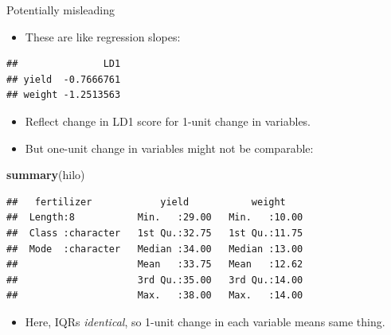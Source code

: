 \documentclass[ignorenonframetext,]{beamer}
\newenvironment{Shaded}{\begin{snugshade}}{\end{snugshade}}
\newcommand{\FloatTok}[1]{\textcolor[rgb]{0.00,0.00,0.81}{#1}}
\newcommand{\KeywordTok}[1]{\textcolor[rgb]{0.13,0.29,0.53}{\textbf{#1}}}
\newcommand{\NormalTok}[1]{#1}
\newcommand{\OperatorTok}[1]{\textcolor[rgb]{0.81,0.36,0.00}{\textbf{#1}}}
\providecommand{\tightlist}{%
  \setlength{\itemsep}{0pt}\setlength{\parskip}{0pt}}
\begin{document}
\begin{frame}[fragile]{Potentially misleading}
\protect\hypertarget{potentially-misleading}{}

\begin{itemize}
\tightlist
\item
  These are like regression slopes:
\end{itemize}

\begin{Shaded}
\end{Shaded}

\begin{verbatim}
##               LD1
## yield  -0.7666761
## weight -1.2513563
\end{verbatim}

\begin{itemize}
\item
  Reflect change in LD1 score for 1-unit change in variables.
\item
  But one-unit change in variables might not be comparable:
\end{itemize}

\begin{Shaded}
\begin{Highlighting}[]
\KeywordTok{summary}\NormalTok{(hilo)}
\end{Highlighting}
\end{Shaded}

\begin{verbatim}
##   fertilizer            yield           weight     
##  Length:8           Min.   :29.00   Min.   :10.00  
##  Class :character   1st Qu.:32.75   1st Qu.:11.75  
##  Mode  :character   Median :34.00   Median :13.00  
##                     Mean   :33.75   Mean   :12.62  
##                     3rd Qu.:35.00   3rd Qu.:14.00  
##                     Max.   :38.00   Max.   :14.00
\end{verbatim}

\begin{itemize}
\tightlist
\item
  Here, IQRs \emph{identical}, so 1-unit change in each variable means
  same thing.
\end{itemize}

\end{frame}
\end{document}
